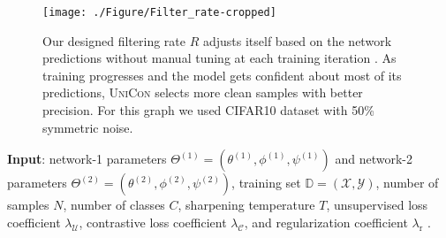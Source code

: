 \documentclass[10pt,twocolumn,letterpaper]{article}
\begin{document}
\begin{figure}
    \centering
    \texttt{[image: ./Figure/Filter\_rate-cropped]}
    \caption{Our designed filtering rate $R$ adjusts itself based on the network predictions without manual tuning at each training iteration  \cite{yao2021jo}. As training progresses and the model gets confident about most of its predictions, \textsc{UniCon} selects more clean samples with better precision. For this graph we used CIFAR10 dataset with 50\% symmetric noise.}
    \label{fig:filter_rate}
\end{figure}
\begin{algorithm*}[htb]
	\DontPrintSemicolon
	\small
	\textbf{Input}: network-1 parameters $\Theta^{(1)} = (\theta^{(1)}, \phi^{(1)}, \psi^{(1)})$  and network-2 parameters $\Theta^{(2)}=(\theta^{(2)}, \phi^{(2)}, \psi^{(2)})$, training set $\mathbb{D} = (\mathcal{X},\mathcal{Y})$, number of samples $N$, number of classes $C$,
	sharpening temperature $T$, unsupervised loss coefficient $\lambda_\mathcal{U}$, contrastive loss coefficient $\lambda_\mathcal{C}$, and regularization coefficient $\lambda_\mathrm{r}$ .  
	

\end{algorithm*}
\end{document}

